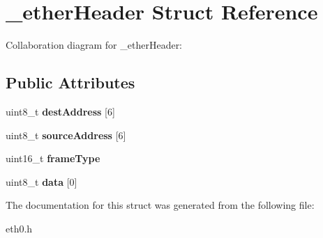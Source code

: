 \hypertarget{struct__etherHeader}{}\section{\+\_\+ether\+Header Struct Reference}
\label{struct__etherHeader}


Collaboration diagram for \+\_\+ether\+Header\+:
\subsection*{Public Attributes}
\begin{DoxyCompactItemize}
\item 
\mbox{\label{struct__etherHeader_a92143e6946b3c56fcbbc1713a8afa7e0}} 
uint8\+\_\+t {\bfseries dest\+Address} \mbox{[}6\mbox{]}
\item 
\mbox{\label{struct__etherHeader_a20b851de2e0073e9d27776edbd3e75c5}} 
uint8\+\_\+t {\bfseries source\+Address} \mbox{[}6\mbox{]}
\item 
\mbox{\label{struct__etherHeader_a2b501a1791fcbfa944fe6f696e874f95}} 
uint16\+\_\+t {\bfseries frame\+Type}
\item 
\mbox{\label{struct__etherHeader_af31a6161fbb6364ac4a0c5c158d42dec}} 
uint8\+\_\+t {\bfseries data} \mbox{[}0\mbox{]}
\end{DoxyCompactItemize}


The documentation for this struct was generated from the following file\+:\begin{DoxyCompactItemize}
\item 
eth0.\+h\end{DoxyCompactItemize}
